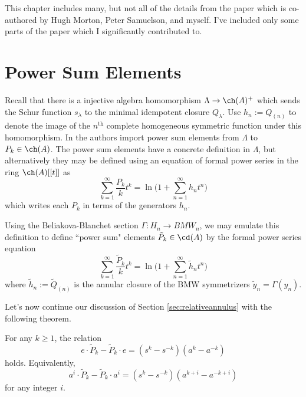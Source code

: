 This chapter includes many, but not all of the details from the paper  which is co-authored by Hugh Morton, Peter Samuelson, and myself. I've included only some parts of the paper which I significantly contributed to. 




\section{Power Sum Elements} \label{sec:powersumelements}

Recall that there is a injective algebra homomorphism $\Lambda \to \ch(A)^+$ which sends the Schur function $s_\lambda$ to the minimal idempotent closure $Q_\lambda$. Use $h_n := Q_{(n)}$ to denote the image of the $n^\textrm{th}$ complete homogeneous symmetric function under this homomorphism. In  the authors import power sum elements from $\Lambda$ to $P_k \in \ch(A)$. The power sum elements have a concrete definition in $\Lambda$, but alternatively they may be defined using an equation of formal power series in the ring $\ch(A)[[t]]$ as
\begin{equation}
\sum_{k=1}^\infty \frac{P_k}{k} t^k = \ln \Bigg( 1 + \sum_{n=1}^\infty h_n t^n \Bigg)
\end{equation}
which writes each $P_k$ in terms of the generators $h_n$. 

Using the Beliakova-Blanchet section $\Gamma: H_n \to BMW_n$, we may emulate this definition to define ``power sum" elements $\tilde{P}_k \in \cd(A)$ by the formal power series equation
\begin{equation}
\sum_{k=1}^\infty \frac{\tilde{P}_k}{k} t^k = \ln \Bigg( 1 + \sum_{n=1}^\infty \tilde{h}_n t^n \Bigg)
\end{equation}
where $\tilde{h}_n := \tilde{Q}_{(n)}$ is the annular closure of the BMW symmetrizers $\tilde{y}_n = \Gamma(y_n)$.

Let's now continue our discussion of Section \ref{sec:relativeannulus} with the following theorem.

\begin{theorem} \label{thm:powersumcommutator}
For any $k \geq 1$, the relation
\begin{equation} \label{eq:powersumcommutator}
e \cdot \tilde{P}_k - \tilde{P}_k \cdot e = (s^k - s^{-k}) (a^k - a^{-k})
\end{equation}
holds. Equivalently,
\begin{equation}
a^i \cdot \tilde{P}_k - \tilde{P}_k \cdot a^i = (s^k - s^{-k}) (a^{k+i} - a^{-k+i})
\end{equation}
for any integer $i$.
\end{theorem}

